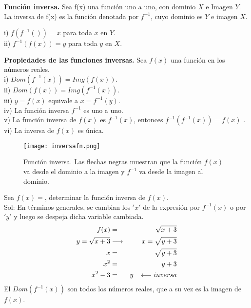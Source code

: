 \begin{mydef}
\textbf{Función inversa.} Sea f(x) una función uno a uno, con dominio $X$ e Imagen $Y$. La inversa de f(x) es la función denotada por $f^{-1}$, cuyo dominio es $Y$ e imagen $X$.

\noindent i) $f(f^{-1}())=x$ para toda $x$ en $Y$.\\
\noindent ii) $f^{-1}(f(x))=y$ para toda $y$ en $X$.\\
\end{mydef}

\begin{mydef}
\textbf{Propiedades de las funciones inversas.} Sea $f(x)$ una función en los números reales.\\

\noindent i) $Dom(f^{-1}(x))=Img(f(x))$. \\

\noindent ii) $Dom(f(x))=Img(f^{-1}(x))$. \\

\noindent iii) $y=f(x)$ equivale a $x=f^{-1}(y)$. \\

\noindent iv) La función inversa $f^{-1}$ es uno a uno. \\

\noindent v) La función inversa de $f(x)$ es $f^{-1}(x)$, entonces $f^{-1}(f^{-1}(x))=f(x)$ . \\

\noindent vi) La inversa de $f(x)$ es única. \\
\label{propinv}
\end{mydef}

\begin{center}
\begin{figure}[h!]
\centering
\texttt{[image: inversafn.png]}
\caption[Función inversa.]{Función inversa. Las flechas negras muestran que la función $f(x)$ va desde el dominio a la imagen y $f^{-1}$ va desde la imagen al dominio.} \label{inversafn}
\end{figure}
\end{center}

\begin{myexample}
Sea $f(x)=$, determinar la función inversa de $f(x)$. \\

\noindent Sol: En términos generales, se cambian los $'x'$ de la expresión por $f^{-1}(x)$ o por $'y'$ y luego se despeja dicha variable cambiada.\\
\begin{eqnarray*}
f(x)&=&\sqrt{x+3} \\
y=\sqrt{x+3}& \longrightarrow &x=\sqrt{y+3} \\
x&=&\sqrt{y+3}\\
x^{2}&=&y+3 \\
x^{2}-3 &=&y \hspace*{8px}\longleftarrow inversa\\
\end{eqnarray*}
El $Dom(f^{-1}(x))$ son todos los números reales, que a su vez es la imagen de $f(x)$.
\end{myexample}

